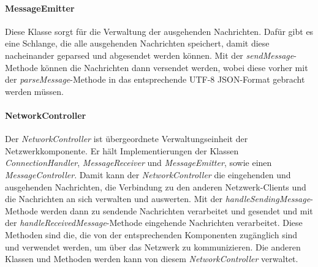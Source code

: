 \documentclass[12pt]{article}
\newcommand{\method}[1]{\textit{#1}-Methode}
\begin{document}
\paragraph{MessageEmitter}
Diese Klasse sorgt für die Verwaltung der ausgehenden Nachrichten. Dafür gibt es eine Schlange, die alle ausgehenden Nachrichten speichert, damit diese nacheinander geparsed und abgesendet werden können. Mit der \method{sendMessage} können die Nachrichten dann \glqq versendet\grqq{} werden, wobei diese vorher mit der \method{parseMessage} in das entsprechende UTF-8 JSON-Format gebracht werden müssen. 

\paragraph{NetworkController}
Der \textit{NetworkController} ist übergeordnete Verwaltungseinheit der Netzwerkkomponente. Er hält Implementierungen der Klassen \textit{ConnectionHandler}, \textit{MessageReceiver} und \textit{MessageEmitter}, sowie einen \textit{MessageController}. Damit kann der \textit{NetworkController} die eingehenden und ausgehenden Nachrichten, die Verbindung zu den anderen Netzwerk-Clients und die 
Nachrichten an sich verwalten und auswerten. Mit der \method{handleSendingMessage} werden dann zu sendende Nachrichten verarbeitet und gesendet und mit der \method{handleReceivedMessage} eingehende Nachrichten verarbeitet. Diese Methoden sind die, die von der entsprechenden Komponenten zugänglich sind und verwendet werden, um über das Netzwerk zu kommunizieren. Die anderen Klassen und Methoden werden kann von diesem \textit{NetworkController} verwaltet. 
\end{document}

